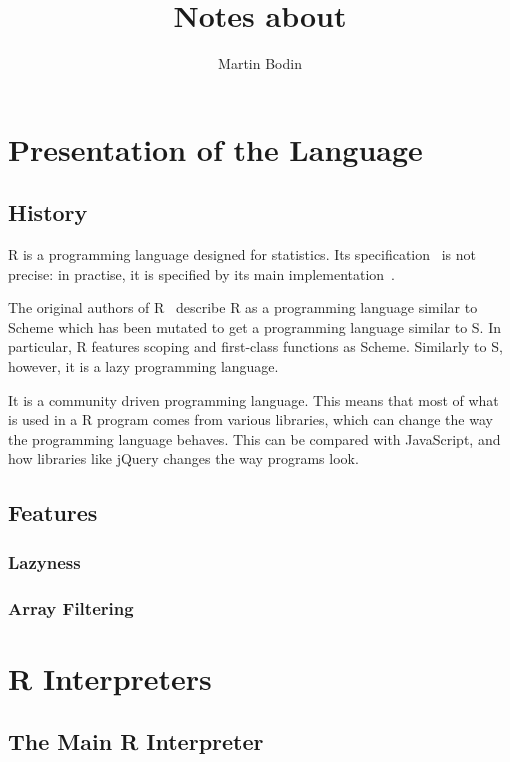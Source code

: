\documentclass{article}
\title{Notes about \R}
\author{Martin Bodin}
\newcommand\R{R}
\begin{document}
\maketitle

\section{Presentation of the Language}

\subsection{History}

\R{} is a programming language designed for statistics.
Its specification~\parencite{team2000r} is not precise:
in practise, it is specified by its main implementation~\parencite{Rwebsite}.

The original authors of \R{}~\parencite{ihaka1996r}
describe \R{} as a programming language similar to Scheme
which has been mutated to get a programming language similar to S.
In particular, \R{} features scoping and first-class functions
as Scheme.
Similarly to S, however, it is a lazy programming language.

It is a community driven programming language.
This means that most of what is used in a \R{} program comes from various libraries,
which can change the way the programming language behaves.
This can be compared with JavaScript,
and how libraries like jQuery changes the way programs look.

\subsection{Features}

\subsubsection{Lazyness}


\subsubsection{Array Filtering}


\section{\R{} Interpreters}

\subsection{The Main \R{} Interpreter}
\end{document}
